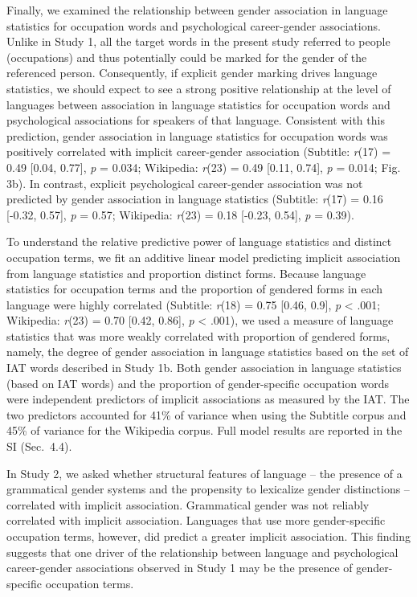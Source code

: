 \documentclass[9pt,twocolumn]{pnas-new}
\begin{document}
Finally, we examined the relationship between gender association in language
statistics for occupation words and psychological career-gender associations. Unlike in Study 1, all the target words in the present study referred to
people (occupations) and thus potentially could be marked for the gender
of the referenced person. Consequently, if explicit gender marking
drives language statistics, we should expect to see a strong positive
relationship at the level of languages between association in language
statistics for occupation words and psychological associations for
speakers of that language. Consistent with this prediction, gender association
in language statistics for occupation words was positively correlated
with implicit career-gender association (Subtitle: \emph{r}(17) = 0.49 {[}0.04, 0.77{]}, \emph{p} = 0.034; Wikipedia: \emph{r}(23) = 0.49 {[}0.11, 0.74{]}, \emph{p} = 0.014; Fig. 3b). In contrast,  explicit psychological career-gender association was not predicted by gender association in language statistics (Subtitle: \emph{r}(17) = 0.16 {[}-0.32, 0.57{]}, \emph{p} = 0.57; Wikipedia: \emph{r}(23) = 0.18 {[}-0.23, 0.54{]}, \emph{p} = 0.39).

To understand the relative predictive power of language statistics and
distinct occupation terms, we fit an additive linear model predicting implicit association
from language statistics and proportion distinct forms. Because language statistics for occupation terms and
the proportion of gendered forms in each language were highly correlated (Subtitle: \emph{r}(18)  = 0.75 {[}0.46, 0.9{]}, \emph{p}
\textless{} .001; Wikipedia: \emph{r}(23) =
0.70  {[}0.42, 0.86{]}, \emph{p} \textless{} .001), we used a measure of language statistics that was more weakly correlated with proportion of gendered forms, namely, the degree of gender association in language statistics
based on the set of IAT words described in Study 1b. Both
gender association in language statistics (based on IAT words) and the
proportion of gender-specific occupation words were independent
predictors of implicit associations as measured by the IAT. The two predictors accounted for 41\% of
variance when using the Subtitle corpus and 45\% of
variance for the Wikipedia corpus. Full model results are reported in
the SI (Sec.\ 4.4).

In Study 2, we asked whether structural features of language -- the
presence of a grammatical gender systems and the propensity to
lexicalize gender distinctions -- correlated with implicit association.
Grammatical gender was not reliably correlated with implicit association.
Languages that use more gender-specific occupation terms, however, did
predict a greater implicit association. This finding suggests that one driver of the relationship between language and psychological career-gender associations observed in Study 1 may be the presence of gender-specific occupation terms. 
\end{document}
